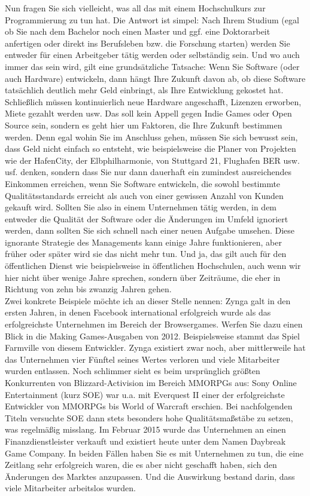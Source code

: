 Nun fragen Sie sich vielleicht, was all das mit einem Hochschulkurs zur Programmierung zu tun hat. Die Antwort ist simpel: Nach Ihrem Studium (egal ob Sie nach dem Bachelor noch einen Master und ggf. eine Doktorarbeit anfertigen oder direkt ins Berufsleben bzw. die Forschung starten) werden Sie entweder für einen Arbeitgeber tätig werden oder selbständig sein. Und wo auch immer das sein wird, gilt eine grundsätzliche Tatsache: Wenn Sie Software (oder auch Hardware) entwickeln, dann hängt Ihre Zukunft davon ab, ob diese Software tatsächlich deutlich mehr Geld einbringt, als Ihre Entwicklung gekostet hat. Schließlich müssen kontinuierlich neue Hardware angeschafft, Lizenzen erworben, Miete gezahlt werden usw. Das soll kein Appell gegen Indie Games oder Open Source sein, sondern es geht hier um Faktoren, die Ihre Zukunft bestimmen werden. Denn egal wohin Sie im Anschluss gehen, müssen Sie sich bewusst sein, dass Geld nicht einfach so entsteht, wie beispielsweise die Planer von Projekten wie der HafenCity, der Elbphilharmonie, von Stuttgard 21, Flughafen BER usw. usf. denken, sondern dass Sie nur dann dauerhaft ein zumindest ausreichendes Einkommen erreichen, wenn Sie Software entwickeln, die sowohl bestimmte Qualitätsstandards erreicht als auch von einer gewissen Anzahl von Kunden gekauft wird. Sollten Sie also in einem Unternehmen tätig werden, in dem entweder die Qualität der Software oder die Änderungen im Umfeld ignoriert werden, dann sollten Sie sich schnell nach einer neuen Aufgabe umsehen. Diese ignorante Strategie des Managements kann einige Jahre funktionieren, aber früher oder später wird sie das nicht mehr tun. Und ja, das gilt auch für den öffentlichen Dienst wie beispielsweise in öffentlichen Hochschulen, auch wenn wir hier nicht über wenige Jahre sprechen, sondern über Zeiträume, die eher in Richtung von zehn bis zwanzig Jahren gehen.\\

Zwei konkrete Beispiele möchte ich an dieser Stelle nennen: Zynga galt in den ersten Jahren, in denen Facebook international erfolgreich wurde als das erfolgreichste Unternehmen im Bereich der Browsergames. Werfen Sie dazu einen Blick in die Making Games-Ausgaben von 2012. Beispielsweise stammt das Spiel Farmville von diesem Entwickler. Zynga existiert zwar noch, aber mittlerweile hat das Unternehmen vier Fünftel seines Wertes verloren und viele Mitarbeiter wurden entlassen. Noch schlimmer sieht es beim ursprünglich größten Konkurrenten von Blizzard-Activision im Bereich MMORPGs aus: Sony Online Entertainment (kurz SOE) war u.a. mit Everquest II einer der erfolgreichste Entwickler von MMORPGs bis World of Warcraft erschien. Bei nachfolgenden Titeln versuchte SOE dann stets besonders hohe Qualitätsmaßstäbe zu setzen, was regelmäßig misslang. Im Februar 2015 wurde das Unternehmen an einen Finanzdienstleister verkauft und existiert heute unter dem Namen Daybreak Game Company. In beiden Fällen haben Sie es mit Unternehmen zu tun, die eine Zeitlang sehr erfolgreich waren, die es aber nicht geschafft haben, sich den Änderungen des Marktes anzupassen. Und die Auswirkung bestand darin, dass viele Mitarbeiter arbeitslos wurden.\\

